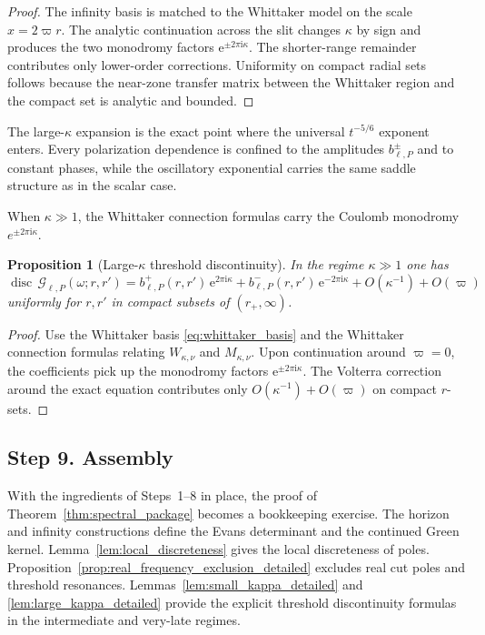 \documentclass[12pt]{article}
\numberwithin{equation}{section}
\theoremstyle{plain}
\newtheorem{proposition}[theorem]{Proposition}
\theoremstyle{definition}
\theoremstyle{remark}
\newcommand{\ii}{\mathrm i}
\newcommand{\ee}{\mathrm e}
\newcommand{\disc}{\operatorname{disc}}
\newcommand{\cG}{\mathcal G}
\newcommand{\om}{\omega}
\newcommand{\vp}{\varpi}
\newcommand{\kap}{\kappa}
\begin{document}
\begin{proof}
The infinity basis is matched to the Whittaker model on the scale $x=2\vp r$.  The analytic continuation across the slit changes $\kap$ by sign and produces the two monodromy factors $\ee^{\pm2\pi\ii\kap}$.  The shorter-range remainder contributes only lower-order corrections.  Uniformity on compact radial sets follows because the near-zone transfer matrix between the Whittaker region and the compact set is analytic and bounded.
\end{proof}

The large-$\kap$ expansion is the exact point where the universal $t^{-5/6}$ exponent enters.  Every polarization dependence is confined to the amplitudes $b_{\ell,P}^\pm$ and to constant phases, while the oscillatory exponential carries the same saddle structure as in the scalar case.


When $\kap\gg1$, the Whittaker connection formulas carry the Coulomb monodromy $e^{\pm2\pi\ii\kap}$.

\begin{proposition}[Large-$\kap$ threshold discontinuity]\label{prop:large_kappa_disc}
In the regime $\kap\gg1$ one has
\begin{equation}\label{eq:large_kappa_disc}
   \disc\,\cG_{\ell,P}(\om;r,r')
   =
   b^+_{\ell,P}(r,r')\,\ee^{2\pi\ii\kap}
   +
   b^-_{\ell,P}(r,r')\,\ee^{-2\pi\ii\kap}
   +
   O(\kap^{-1})+O(\vp)
\end{equation}
uniformly for $r,r'$ in compact subsets of $(r_+,\infty)$.
\end{proposition}

\begin{proof}
Use the Whittaker basis \eqref{eq:whittaker_basis} and the Whittaker connection formulas relating $W_{\kap,\nu}$ and $M_{\kap,\nu}$.  Upon continuation around $\vp=0$, the coefficients pick up the monodromy factors $\ee^{\pm2\pi\ii\kap}$.  The Volterra correction around the exact equation contributes only $O(\kap^{-1})+O(\vp)$ on compact $r$-sets.
\end{proof}

\subsection*{Step 9. Assembly}

With the ingredients of Steps~1--8 in place, the proof of Theorem~\ref{thm:spectral_package} becomes a bookkeeping exercise.  The horizon and infinity constructions define the Evans determinant and the continued Green kernel.  Lemma~\ref{lem:local_discreteness} gives the local discreteness of poles.  Proposition~\ref{prop:real_frequency_exclusion_detailed} excludes real cut poles and threshold resonances.  Lemmas~\ref{lem:small_kappa_detailed} and \ref{lem:large_kappa_detailed} provide the explicit threshold discontinuity formulas in the intermediate and very-late regimes.
\end{document}
